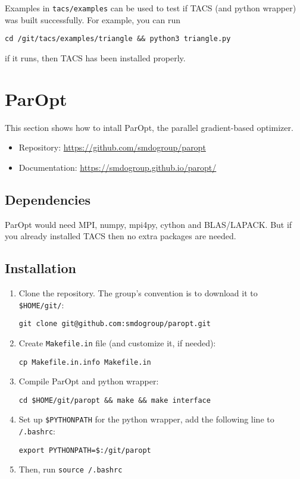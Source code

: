 \documentclass{article}
\begin{document}
Examples in \texttt{tacs/examples} can be used to test if TACS (and python wrapper) was built
successfully. For example, you can run

\texttt{cd \texttildelow/git/tacs/examples/triangle \&\& python3 triangle.py}

if it runs, then TACS has been installed properly.

\section{ParOpt}

This section shows how to intall ParOpt, the parallel gradient-based optimizer.

\begin{itemize}
    \item Repository: \href{https://github.com/smdogroup/paropt}{https://github.com/smdogroup/paropt}
    \item Documentation: \href{https://smdogroup.github.io/paropt/}{https://smdogroup.github.io/paropt/}
\end{itemize}

\subsection{Dependencies}

ParOpt would need MPI, numpy, mpi4py, cython and BLAS/LAPACK. But if you already
installed TACS then no extra packages are needed.

\subsection{Installation}

\begin{enumerate}

    \item Clone the repository. The group's convention is to download it to
    \texttt{\$HOME/git/}:

    \texttt{git clone git@github.com:smdogroup/paropt.git}

    \item Create \texttt{Makefile.in} file (and customize it, if needed):

    \texttt{cp Makefile.in.info Makefile.in}

    \item Compile ParOpt and python wrapper:

    \texttt{cd \$HOME/git/paropt \&\& make \&\& make interface}

    \item Set up \texttt{\$PYTHONPATH} for the python wrapper, add the following line to \texttt{\texttildelow/.bashrc}:

    \texttt{export PYTHONPATH=\$:\texttildelow/git/paropt}

    \item Then, run \texttt{source \texttildelow/.bashrc}

\end{enumerate}
\end{document}
